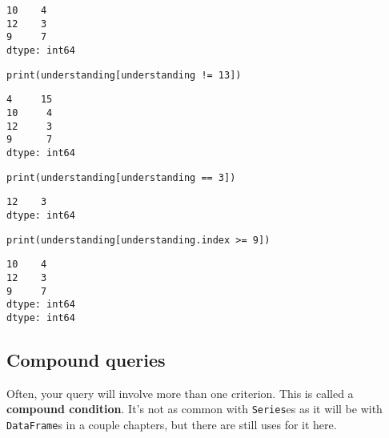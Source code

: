 \begin{Verbatim}[fontsize=\small,samepage=true,frame=leftline,framesep=5mm,framerule=1mm]
10    4
12    3
9     7
dtype: int64
\end{Verbatim}

\begin{Verbatim}[fontsize=\small,samepage=true,frame=single,framesep=3mm]
print(understanding[understanding != 13])
\end{Verbatim}
\vspace{-.3in}

\begin{Verbatim}[fontsize=\small,samepage=true,frame=leftline,framesep=5mm,framerule=1mm]
4     15
10     4
12     3
9      7
dtype: int64
\end{Verbatim}

\begin{Verbatim}[fontsize=\small,samepage=true,frame=single,framesep=3mm]
print(understanding[understanding == 3])
\end{Verbatim}
\vspace{-.3in}

\begin{Verbatim}[fontsize=\small,samepage=true,frame=leftline,framesep=5mm,framerule=1mm]
12    3
dtype: int64
\end{Verbatim}

\begin{Verbatim}[fontsize=\small,samepage=true,frame=single,framesep=3mm]
print(understanding[understanding.index >= 9])
\end{Verbatim}
\vspace{-.3in}

\begin{Verbatim}[fontsize=\small,samepage=true,frame=leftline,framesep=5mm,framerule=1mm]
10    4
12    3
9     7
dtype: int64
dtype: int64
\end{Verbatim}


\subsection{Compound queries}


Often, your query will involve more than one criterion. This is called a
\textbf{compound condition}. It's not as common with \texttt{Series}es as it
will be with \texttt{DataFrame}s in a couple chapters, but there are still uses
for it here.


